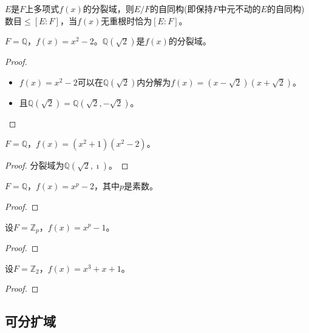 \begin{theorem}
	$E$是$F$上多项式$f(x)$的分裂域，则$E/F$的自同构(即保持$F$中元不动的$E$的自同构)数目$\leq [E:F]$，当$f(x)$无重根时恰为$[E:F]$。
\end{theorem}



\begin{example}
	$F=\mathbb{Q}$，$f(x)=x^{2}-2$。$\mathbb{Q}(\sqrt{2})$是$f(x)$的分裂域。
\end{example}

\begin{proof}
	\begin{itemize}
		\item $f(x)=x^{2}-2$可以在$\mathbb{Q}(\sqrt{2})$内分解为$f(x)=(x-\sqrt{2})(x+\sqrt{2})$。
		\item 且$\mathbb{Q}(\sqrt{2})=\mathbb{Q}(\sqrt{2},-\sqrt{2})$。
	\end{itemize}
\end{proof}

\begin{example}
	$F=\mathbb{Q}$，$f(x)=(x^{2}+1)(x^{2}-2)$。
\end{example}

\begin{proof}
	分裂域为$\mathbb{Q}(\sqrt{2},\imath)$。
\end{proof}

\begin{example}
	$F=\mathbb{Q}$，$f(x)=x^{p}-2$，其中$p$是素数。
\end{example}

\begin{proof}
	
\end{proof}

\begin{example}
	设$F=\mathbb{Z}_{p}$，$f(x)=x^{p}-1$。
\end{example}

\begin{proof}
	
\end{proof}

\begin{example}
	设$F=\mathbb{Z}_{2}$，$f(x)=x^{3}+x+1$。
\end{example}

\begin{proof}
	
\end{proof}

\subsection{可分扩域}

